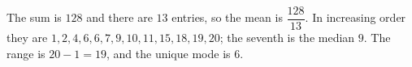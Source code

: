 The sum is $128$ and there are $13$ entries, so the mean is $\boxed{\dfrac{128}{13}}$. In increasing order they are $1,2,4,6,6,7,9,10,11,15,18,19,20$; the seventh is the median $\boxed9$. The range is $20-1=\boxed{19}$, and the unique mode is $\boxed6$.
